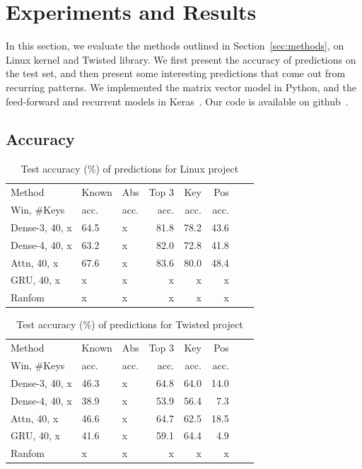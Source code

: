 \section{Experiments and Results}
\label{sec:results}

In this section, we evaluate the methods outlined in Section~\ref{sec:methods},
on Linux kernel and Twisted library. We first present the accuracy of
predictions on the test set, and then present some interesting predictions that
come out from recurring patterns. We implemented the matrix vector model in
Python, and the feed-forward and recurrent models in Keras~\cite{ref:keras}.
Our code is available on github~\cite{ref:codecompletion}.

\subsection{Accuracy}
\label{sec:accuracy}

\begin{table}[h]
  \centering
  \small {
  \begin{tabular}{l l l r r r r r}
    \hline
    Method & Known & Abs & Top 3 & Key & Pos \\
    Win, \#Keys & acc. & acc. & acc.  & acc. & acc. \\
    \hline
    Dense-3, 40, x & 64.5 & x & 81.8 & 78.2 & 43.6\\
    Dense-4, 40, x & 63.2 & x & 82.0 & 72.8 & 41.8\\
    Attn, 40, x & 67.6 & x & 83.6 & 80.0 & 48.4\\
    GRU, 40, x & x & x & x & x & x\\
    Ranfom & x & x & x & x & x\\
    \hline
  \end{tabular}
  }
  \caption{Test accuracy (\%) of predictions for Linux project}
  \label{tab:linux}
\end{table}

\begin{table}[h]
  \centering
  \small {
  \begin{tabular}{l l l r r r r r}
    \hline
    Method & Known & Abs & Top 3 & Key & Pos \\
    Win, \#Keys & acc. & acc. & acc.  & acc. & acc. \\
    \hline
    Dense-3, 40, x & 46.3 & x & 64.8 & 64.0 & 14.0\\
    Dense-4, 40, x & 38.9 & x & 53.9 & 56.4 & 7.3\\
    Attn, 40, x & 46.6 & x & 64.7 & 62.5 & 18.5\\
    GRU, 40, x & 41.6 & x & 59.1 & 64.4 & 4.9\\
    Ranfom & x & x & x & x & x\\
    \hline
  \end{tabular}
  }
  \caption{Test accuracy (\%) of predictions for Twisted project}
  \label{tab:twisted}
\end{table}

